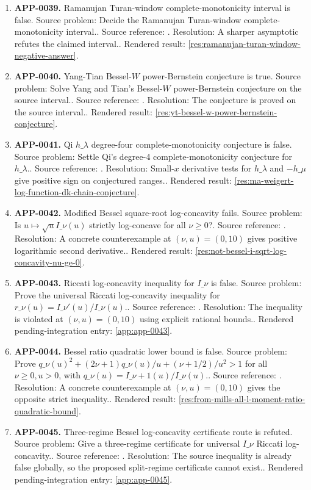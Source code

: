 \begin{enumerate}[leftmargin=*]
\item \textbf{APP-0039.} Ramanujan Turan-window complete-monotonicity interval is false.  Source problem: Decide the Ramanujan Turan-window complete-monotonicity interval.. Source reference: \cite{mishra-swaminathan-ramanujan}. Resolution: A sharper asymptotic refutes the claimed interval.. Rendered result: \ref{res:ramanujan-turan-window-negative-answer}.
\item \textbf{APP-0040.} Yang-Tian Bessel-\(W\) power-Bernstein conjecture is true.  Source problem: Solve Yang and Tian's Bessel-\(W\) power-Bernstein conjecture on the source interval.. Source reference: \cite{app-app-0040-source}. Resolution: The conjecture is proved on the source interval.. Rendered result: \ref{res:yt-bessel-w-power-bernstein-conjecture}.
\item \textbf{APP-0041.} Qi \(h\_\lambda\) degree-four complete-monotonicity conjecture is false.  Source problem: Settle Qi's degree-4 complete-monotonicity conjecture for \(h\_\lambda\).. Source reference: \cite{qi-hlambda}. Resolution: Small-\(x\) derivative tests for \(h\_\lambda\) and \(-h\_\mu\) give positive sign on conjectured ranges.. Rendered result: \ref{res:ma-weigert-log-function-dk-chain-conjecture}.
\item \textbf{APP-0042.} Modified Bessel square-root log-concavity fails.  Source problem: Is \(u\mapsto \sqrt{u}I\_\nu(u)\) strictly log-concave for all \(\nu\ge0\)?. Source reference: \cite{app-app-0042-source}. Resolution: A concrete counterexample at \((\nu,u)=(0,10)\) gives positive logarithmic second derivative.. Rendered result: \ref{res:not-bessel-i-sqrt-log-concavity-nu-ge-0}.
\item \textbf{APP-0043.} Riccati log-concavity inequality for \(I\_\nu\) is false.  Source problem: Prove the universal Riccati log-concavity inequality for \(r\_\nu(u)=I\_\nu'(u)/I\_\nu(u)\).. Source reference: \cite{app-app-0042-source}. Resolution: The inequality is violated at \((\nu,u)=(0,10)\) using explicit rational bounds.. Rendered pending-integration entry: \ref{app:app-0043}.
\item \textbf{APP-0044.} Bessel ratio quadratic lower bound is false.  Source problem: Prove \(q\_\nu(u)^2+(2\nu+1)q\_\nu(u)/u+(\nu+1/2)/u^2>1\) for all \(\nu\ge0,u>0\), with \(q\_\nu(u)=I\_{\nu+1}(u)/I\_\nu(u)\).. Source reference: \cite{app-app-0042-source}. Resolution: A concrete counterexample at \((\nu,u)=(0,10)\) gives the opposite strict inequality.. Rendered result: \ref{res:from-mills-all-l-moment-ratio-quadratic-bound}.
\item \textbf{APP-0045.} Three-regime Bessel log-concavity certificate route is refuted.  Source problem: Give a three-regime certificate for universal \(I\_\nu\) Riccati log-concavity.. Source reference: \cite{app-app-0042-source}. Resolution: The source inequality is already false globally, so the proposed split-regime certificate cannot exist.. Rendered pending-integration entry: \ref{app:app-0045}.
\end{enumerate}
